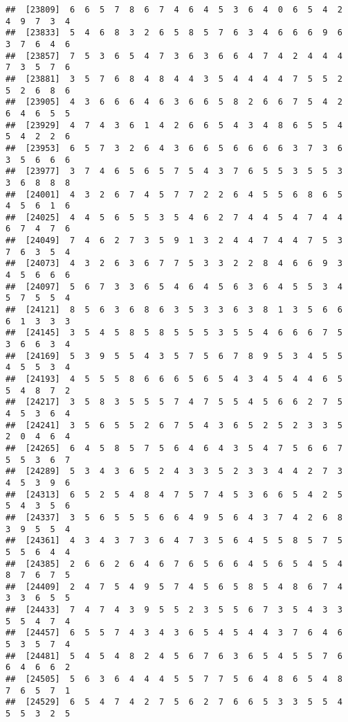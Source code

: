 \documentclass[
]{book}
\begin{document}
\begin{verbatim}
##  [23809]  6  6  5  7  8  6  7  4  6  4  5  3  6  4  0  6  5  4  2  4  9  7  3  4
##  [23833]  5  4  6  8  3  2  6  5  8  5  7  6  3  4  6  6  6  9  6  3  7  6  4  6
##  [23857]  7  5  3  6  5  4  7  3  6  3  6  6  4  7  4  2  4  4  4  7  3  5  7  6
##  [23881]  3  5  7  6  8  4  8  4  4  3  5  4  4  4  4  7  5  5  2  5  2  6  8  6
##  [23905]  4  3  6  6  6  4  6  3  6  6  5  8  2  6  6  7  5  4  2  6  4  6  5  5
##  [23929]  4  7  4  3  6  1  4  2  6  6  5  4  3  4  8  6  5  5  4  5  4  2  2  6
##  [23953]  6  5  7  3  2  6  4  3  6  6  5  6  6  6  6  3  7  3  6  3  5  6  6  6
##  [23977]  3  7  4  6  5  6  5  7  5  4  3  7  6  5  5  3  5  5  3  3  6  8  8  8
##  [24001]  4  3  2  6  7  4  5  7  7  2  2  6  4  5  5  6  8  6  5  4  5  6  1  6
##  [24025]  4  4  5  6  5  5  3  5  4  6  2  7  4  4  5  4  7  4  4  6  7  4  7  6
##  [24049]  7  4  6  2  7  3  5  9  1  3  2  4  4  7  4  4  7  5  3  7  6  3  5  4
##  [24073]  4  3  2  6  3  6  7  7  5  3  3  2  2  8  4  6  6  9  3  4  5  6  6  6
##  [24097]  5  6  7  3  3  6  5  4  6  4  5  6  3  6  4  5  5  3  4  5  7  5  5  4
##  [24121]  8  5  6  3  6  8  6  3  5  3  3  6  3  8  1  3  5  6  6  6  1  3  3  3
##  [24145]  3  5  4  5  8  5  8  5  5  5  3  5  5  4  6  6  6  7  5  3  6  6  3  4
##  [24169]  5  3  9  5  5  4  3  5  7  5  6  7  8  9  5  3  4  5  5  4  5  5  3  4
##  [24193]  4  5  5  5  8  6  6  6  5  6  5  4  3  4  5  4  4  6  5  5  4  8  7  2
##  [24217]  3  5  8  3  5  5  5  7  4  7  5  5  4  5  6  6  2  7  5  4  5  3  6  4
##  [24241]  3  5  6  5  5  2  6  7  5  4  3  6  5  2  5  2  3  3  5  2  0  4  6  4
##  [24265]  6  4  5  8  5  7  5  6  4  6  4  3  5  4  7  5  6  6  7  5  5  3  6  7
##  [24289]  5  3  4  3  6  5  2  4  3  3  5  2  3  3  4  4  2  7  3  4  5  3  9  6
##  [24313]  6  5  2  5  4  8  4  7  5  7  4  5  3  6  6  5  4  2  5  5  4  3  5  6
##  [24337]  3  5  6  5  5  5  6  6  4  9  5  6  4  3  7  4  2  6  8  3  9  5  5  4
##  [24361]  4  3  4  3  7  3  6  4  7  3  5  6  4  5  5  8  5  7  5  5  5  6  4  4
##  [24385]  2  6  6  2  6  4  6  7  6  5  6  6  4  5  6  5  4  5  4  8  7  6  7  5
##  [24409]  2  4  7  5  4  9  5  7  4  5  6  5  8  5  4  8  6  7  4  3  3  6  5  5
##  [24433]  7  4  7  4  3  9  5  5  2  3  5  5  6  7  3  5  4  3  3  5  5  4  7  4
##  [24457]  6  5  5  7  4  3  4  3  6  5  4  5  4  4  3  7  6  4  6  5  3  5  7  4
##  [24481]  5  4  5  4  8  2  4  5  6  7  6  3  6  5  4  5  5  7  6  6  4  6  6  2
##  [24505]  5  6  3  6  4  4  4  5  5  7  7  5  6  4  8  6  5  4  8  7  6  5  7  1
##  [24529]  6  5  4  7  4  2  7  5  6  2  7  6  6  5  3  3  5  5  4  5  5  3  2  5

\end{verbatim}
\end{document}
